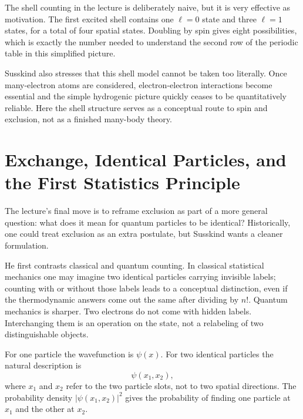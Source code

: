 The shell counting in the lecture is deliberately naive, but it is very effective as motivation. The first excited shell contains one \(\ell=0\) state and three \(\ell=1\) states, for a total of four spatial states. Doubling by spin gives eight possibilities, which is exactly the number needed to understand the second row of the periodic table in this simplified picture.

Susskind also stresses that this shell model cannot be taken too literally. Once many-electron atoms are considered, electron-electron interactions become essential and the simple hydrogenic picture quickly ceases to be quantitatively reliable. Here the shell structure serves as a conceptual route to spin and exclusion, not as a finished many-body theory.

\section{Exchange, Identical Particles, and the First Statistics Principle}

The lecture's final move is to reframe exclusion as part of a more general question: what does it mean for quantum particles to be identical? Historically, one could treat exclusion as an extra postulate, but Susskind wants a cleaner formulation.

He first contrasts classical and quantum counting. In classical statistical mechanics one may imagine two identical particles carrying invisible labels; counting with or without those labels leads to a conceptual distinction, even if the thermodynamic answers come out the same after dividing by \(n!\). Quantum mechanics is sharper. Two electrons do not come with hidden labels. Interchanging them is an operation on the state, not a relabeling of two distinguishable objects.

For one particle the wavefunction is \(\psi(x)\). For two identical particles the natural description is
\begin{equation}
\psi(x_{1},x_{2}),
\end{equation}
where \(x_{1}\) and \(x_{2}\) refer to the two particle slots, not to two spatial directions. The probability density \(|\psi(x_{1},x_{2})|^{2}\) gives the probability of finding one particle at \(x_{1}\) and the other at \(x_{2}\).

